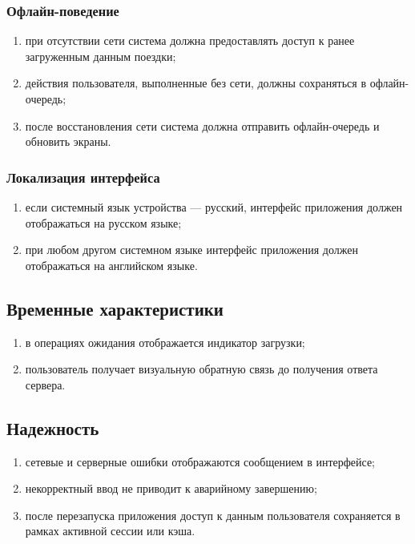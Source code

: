 \documentclass[12pt,a4paper]{article}
\begin{document}
\subsubsection{Офлайн-поведение}
\begin{enumerate}
  \item при отсутствии сети система должна предоставлять доступ к ранее загруженным данным поездки;
  \item действия пользователя, выполненные без сети, должны сохраняться в офлайн-очередь;
  \item после восстановления сети система должна отправить офлайн-очередь и обновить экраны.
\end{enumerate}

\subsubsection{Локализация интерфейса}
\begin{enumerate}
  \item если системный язык устройства --- русский, интерфейс приложения должен отображаться на русском языке;
  \item при любом другом системном языке интерфейс приложения должен отображаться на английском языке.
\end{enumerate}

\subsection{Временные характеристики}
\begin{enumerate}
  \item в операциях ожидания отображается индикатор загрузки;
  \item пользователь получает визуальную обратную связь до получения ответа сервера.
\end{enumerate}

\subsection{Надежность}
\begin{enumerate}
  \item сетевые и серверные ошибки отображаются сообщением в интерфейсе;
  \item некорректный ввод не приводит к аварийному завершению;
  \item после перезапуска приложения доступ к данным пользователя сохраняется в рамках
  активной сессии или кэша.
\end{enumerate}
\end{document}
